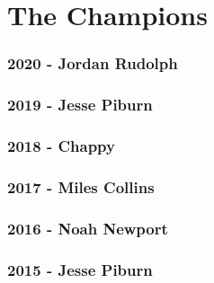 \documentclass[
]{book}
\begin{document}
\hypertarget{appendix-appendix}{%
\appendix}


\hypertarget{the-champions}{%
\chapter{The Champions}\label{the-champions}}

\hypertarget{jordan-rudolph}{%
\subsection*{\texorpdfstring{\textbf{2020} - Jordan Rudolph}{2020 - Jordan Rudolph}}\label{jordan-rudolph}}

\hypertarget{jesse-piburn}{%
\subsection*{\texorpdfstring{\textbf{2019} - Jesse Piburn}{2019 - Jesse Piburn}}\label{jesse-piburn}}

\hypertarget{chappy}{%
\subsection*{\texorpdfstring{\textbf{2018} - Chappy}{2018 - Chappy}}\label{chappy}}

\hypertarget{miles-collins-1}{%
\subsection*{\texorpdfstring{\textbf{2017} - Miles Collins}{2017 - Miles Collins}}\label{miles-collins-1}}

\hypertarget{noah-newport}{%
\subsection*{\texorpdfstring{\textbf{2016} - Noah Newport}{2016 - Noah Newport}}\label{noah-newport}}

\hypertarget{jesse-piburn-1}{%
\subsection*{\texorpdfstring{\textbf{2015} - Jesse Piburn}{2015 - Jesse Piburn}}\label{jesse-piburn-1}}
\end{document}
